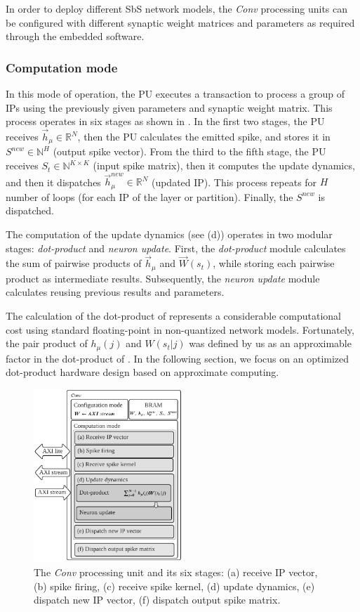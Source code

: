In order to deploy different SbS network models, the \emph{Conv} processing units can be configured with different synaptic weight matrices and parameters as required through the embedded software.

\subsubsection{Computation mode}
In this mode of operation, the PU executes a transaction to process a group of IPs using the previously given parameters and synaptic weight matrix. This process operates in six stages as shown in . In the first two stages, the PU receives $\vec{h}_\mu\in\mathbb{R}^{N}$, then the PU calculates the emitted spike, and stores it in $S^{new}\in\mathbb{N}^{H}$ (output spike vector). From the third to the fifth stage, the PU receives $S_t\in\mathbb{N}^{K\times K}$ (input spike matrix), then it computes the update dynamics, and then it dispatches $\vec{h}_\mu^{new}\in\mathbb{R}^{N}$ (updated IP). This process repeats for $H$ number of loops (for each IP of the layer or partition). Finally, the $S^{new}$ is dispatched.

The computation of the update dynamics (see (d)) operates in two modular stages: \emph{dot-product} and \emph{neuron update}. First, the \emph{dot-product} module calculates the sum of pairwise products of $\vec{h}_{\mu}$ and $\vec{W}(s_t)$, while storing each pairwise product as intermediate results. Subsequently, the \emph{neuron update} module calculates  reusing previous results and parameters.


The calculation of the dot-product of  represents a considerable computational cost using standard floating-point in non-quantized network models. Fortunately, the pair product of $h_{\mu}(j)$ and $W(s_t|j)$ was defined by us as an approximable factor in the dot-product of . In the following section, we focus on an optimized dot-product hardware design based on approximate computing.


\begin{figure}[t!]
	\centering
	\includegraphics[width=0.5\textwidth]{../figures/sbs_conv.pdf}
	\caption{The \emph{Conv} processing unit and its six stages: (a) receive IP vector, (b) spike firing, (c) receive spike kernel, (d) update dynamics, (e) dispatch new IP vector, (f) dispatch output spike matrix.}
	\label{fig:hw_conv}
\end{figure}

